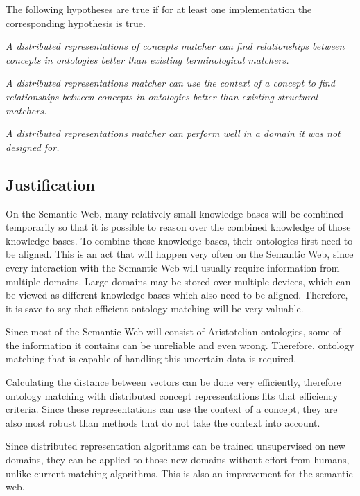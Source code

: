 \documentclass{article}
\begin{document}
 The following hypotheses are true if for at least one implementation the corresponding hypothesis is true.

 \begin{center}  
 \textit{A distributed representations of concepts matcher can find relationships between concepts in ontologies better than existing terminological matchers.}
 \end{center} 
 \begin{center}
 \textit{A distributed representations matcher can use the context of a concept to find relationships between concepts in ontologies better than existing structural matchers.}
 \end{center}
 \begin{center}
 \textit{A distributed representations matcher can perform well in a domain it was not designed for.}
 \end{center}
 
 \subsection{Justification}
 On the Semantic Web, many relatively small knowledge bases will be combined temporarily so that it is possible to reason over the combined knowledge of those knowledge bases. To combine these knowledge bases, their ontologies first need to be aligned. This is an act that will happen very often on the Semantic Web, since every interaction with the Semantic Web will usually require information from multiple domains. Large domains may be stored over multiple devices, which can be viewed as different knowledge bases which also need to be aligned. Therefore, it is save to say that efficient ontology matching will be very valuable.
 
 Since most of the Semantic Web will consist of Aristotelian ontologies, some of the information it contains can be unreliable and even wrong. Therefore, ontology matching that is capable of handling this uncertain data is required.
 
 Calculating the distance between vectors can be done very efficiently, therefore ontology matching with distributed concept representations fits that efficiency criteria. Since these representations can use the context of a concept, they are also most robust than methods that do not take the context into account.
 
 Since distributed representation algorithms can be trained unsupervised on new domains, they can be applied to those new domains without effort from humans, unlike current matching algorithms. This is also an improvement for the semantic web.
 
\end{document}
